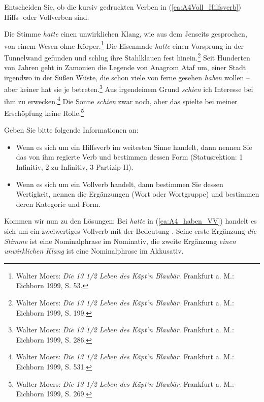 Entscheiden Sie, ob die kursiv gedruckten Verben in (\ref{ea:A4Voll_Hilfsverb}) Hilfs- oder Vollverben sind.

\ea \label{ea:A4Voll_Hilfsverb}
\ea \label{ea:A4_haben_VV} Die Stimme \textit{hatte} einen unwirklichen Klang, wie aus dem Jenseits gesprochen, von einem Wesen ohne Körper.\footnote{Walter Moers: \textit{Die 13 1/2 Leben des Käpt'n Blaubär}. Frankfurt a. M.: Eichborn 1999, S. 53.}
\ex \label{ex:A4_haben_HV} Die Eisenmade \textit{hatte} einen Vorsprung in der Tunnelwand gefunden und schlug ihre Stahlklauen fest hinein.\footnote{Walter Moers: \textit{Die 13 1/2 Leben des Käpt'n Blaubär}. Frankfurt a. M.: Eichborn 1999, S. 199.}
\ex \label{ex:A4_gewonnen_haben} Seit Hunderten von Jahren geht in Zamonien die Legende von Anagrom Ataf um, einer Stadt irgendwo in der Süßen Wüste, die schon viele von ferne gesehen \textit{haben} wollen – aber keiner hat sie je betreten.\footnote{Walter Moers: \textit{Die 13 1/2 Leben des Käpt'n Blaubär}. Frankfurt a. M.: Eichborn 1999, S. 286.}
\ex \label{ex:A4_scheinen_HV}  Aus irgendeinem Grund \textit{schien} ich Interesse bei ihm zu erwecken.\footnote{Walter Moers: \textit{Die 13 1/2 Leben des Käpt'n Blaubär}. Frankfurt a. M.: Eichborn 1999, S. 531.}
\ex \label{ex:A4_scheinen_VV} Die Sonne \textit{schien} zwar noch, aber das spielte bei meiner Erschöpfung keine Rolle.\footnote{Walter Moers: \textit{Die 13 1/2 Leben des Käpt'n Blaubär}. Frankfurt a. M.: Eichborn 1999, S. 269.}
\z 
\z 

Geben Sie bitte folgende Informationen an:

\begin{itemize}

\item Wenn es sich um ein Hilfsverb im weitesten Sinne handelt, dann nennen Sie das von ihm regierte Verb und bestimmen dessen Form (Statusrektion: 1 Infinitiv, 2 zu-Infinitiv, 3 Partizip II).

\item Wenn es sich um ein Vollverb handelt, dann bestimmen Sie dessen Wertigkeit, nennen die Ergänzungen (Wort oder Wortgruppe) und bestimmen deren Kategorie und Form. 

\end{itemize}


Kommen wir nun zu den Lösungen: Bei \textit{hatte} in (\ref{ea:A4_haben_VV}) handelt es sich um ein zweiwertiges Vollverb mit der Bedeutung . Seine erste Ergänzung \textit{die Stimme} ist eine Nominalphrase im Nominativ, die zweite Ergänzung \textit{einen unwirklichen Klang} ist eine Nominalphrase im Akkusativ.

